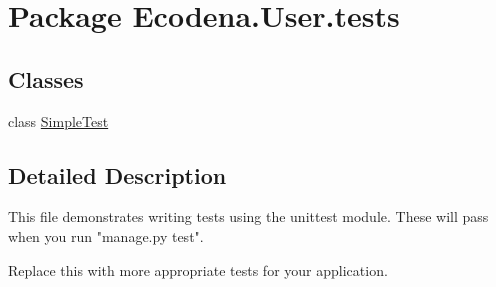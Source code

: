 \hypertarget{namespace_ecodena_1_1_user_1_1tests}{
\section{Package Ecodena.User.tests}
\label{d4/dcf/namespace_ecodena_1_1_user_1_1tests}
}
\subsection*{Classes}
\begin{DoxyCompactItemize}
\item 
class \hyperlink{class_ecodena_1_1_user_1_1tests_1_1_simple_test}{SimpleTest}
\end{DoxyCompactItemize}


\subsection{Detailed Description}
\begin{DoxyVerb}
This file demonstrates writing tests using the unittest module. These will pass
when you run "manage.py test".

Replace this with more appropriate tests for your application.
\end{DoxyVerb}
 